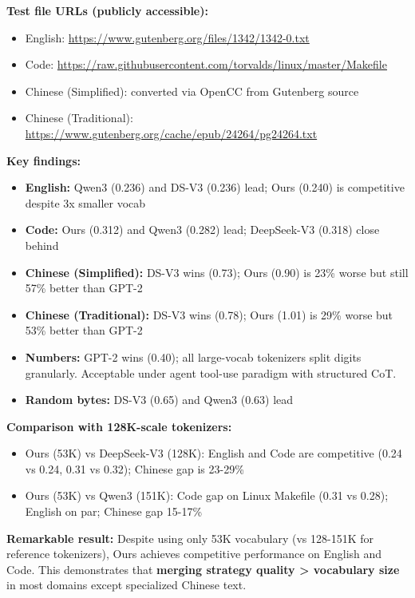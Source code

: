\textbf{Test file URLs (publicly accessible):}
\begin{itemize}
    \item English: \url{https://www.gutenberg.org/files/1342/1342-0.txt}
    \item Code: \url{https://raw.githubusercontent.com/torvalds/linux/master/Makefile}
    \item Chinese (Simplified): converted via OpenCC from Gutenberg source
    \item Chinese (Traditional): \url{https://www.gutenberg.org/cache/epub/24264/pg24264.txt}
\end{itemize}

\textbf{Key findings:}
\begin{itemize}
    \item \textbf{English:} Qwen3 (0.236) and DS-V3 (0.236) lead; Ours (0.240) is competitive despite 3x smaller vocab
    \item \textbf{Code:} Ours (0.312) and Qwen3 (0.282) lead; DeepSeek-V3 (0.318) close behind
    \item \textbf{Chinese (Simplified):} DS-V3 wins (0.73); Ours (0.90) is 23\% worse but still 57\% better than GPT-2
    \item \textbf{Chinese (Traditional):} DS-V3 wins (0.78); Ours (1.01) is 29\% worse but 53\% better than GPT-2
    \item \textbf{Numbers:} GPT-2 wins (0.40); all large-vocab tokenizers split digits granularly. Acceptable under agent tool-use paradigm with structured CoT.
    \item \textbf{Random bytes:} DS-V3 (0.65) and Qwen3 (0.63) lead
\end{itemize}

\textbf{Comparison with 128K-scale tokenizers:}
\begin{itemize}
    \item Ours (53K) vs DeepSeek-V3 (128K): English and Code are competitive (0.24 vs 0.24, 0.31 vs 0.32); Chinese gap is 23-29\%
    \item Ours (53K) vs Qwen3 (151K): Code gap on Linux Makefile (0.31 vs 0.28); English on par; Chinese gap 15-17\%
\end{itemize}

\textbf{Remarkable result:} Despite using only 53K vocabulary (vs 128-151K for reference tokenizers), Ours achieves competitive performance on English and Code. This demonstrates that \textbf{merging strategy quality > vocabulary size} in most domains except specialized Chinese text.

